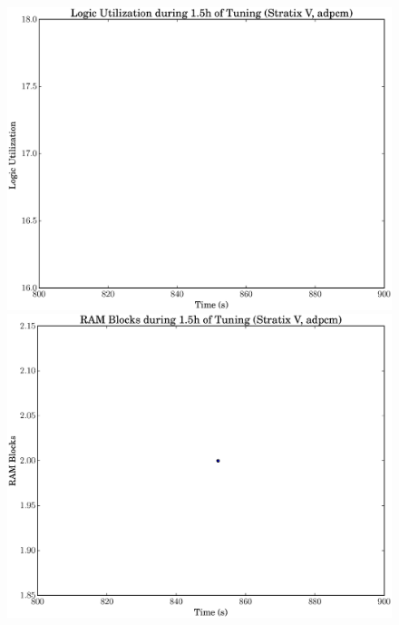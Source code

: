 \documentclass[12pt, a4paper]{article}
\begin{document}
\begin{figure}[htpb]
    \centering
    \noindent
    \begin{minipage}{.48\textwidth}
        \centering
        \includegraphics[scale=.25]{adpcm_lu_5400_chstone_StratixV}
    \end{minipage}%
    \hfill
    \begin{minipage}{.48\textwidth}
        \centering
        \includegraphics[scale=.25]{adpcm_ram_5400_chstone_StratixV}
    \end{minipage}%


\end{figure}
\end{document}
